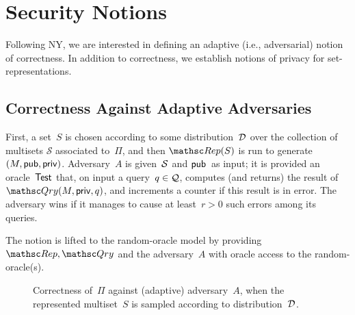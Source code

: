 \section{Security Notions}
\label{sec:security-notions}
Following NY, we are interested in defining an adaptive (i.e.,
adversarial) notion of correctness.
In addition to correctness, we establish notions of privacy for
set-representations.


\subsection{Correctness Against Adaptive Adversaries}

First, a set~$S$ is chosen according to some
distribution~$\mathcal{D}_{}^{}$ over the collection of multisets
$\mathcal{S}$ associated to~$\Pi$, and then
$\Rep(S)$ is run to generate $(M,{\sf pub},{\sf priv})$.
Adversary~$A$ is given~${\cal S}$ and ${\sf pub}$~as input; it is
provided an oracle~$\mathsf{Test}$ that, on input a query~$q \in {\cal Q}$,
computes (and returns) the result of $\Qry(M,\privaux,q)$, and increments
a counter if this result is in error.  The adversary wins if it
manages to cause at least~$r>0$ such errors among its queries.

The notion is lifted to the random-oracle model by providing
$\Rep,\Qry$ and the adversary~$A$ with oracle access to the
random-oracle(s).



\begin{figure}[htp]
\centering
{}
\caption{Correctness of~$\Pi$ against (adaptive) adversary~$A$, when
  the represented multiset~$S$ is sampled according to distribution~$\mathcal{D}_{}^{}$.}
\label{fig:correctness}
\end{figure}

